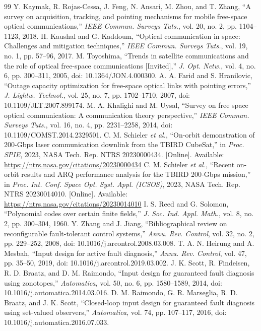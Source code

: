 \begin{thebibliography}{99}
 Y. Kaymak, R. Rojas-Cessa, J. Feng, N. Ansari, M. Zhou, and T. Zhang, ``A survey on acquisition, tracking, and pointing mechanisms for mobile free-space optical communications,'' \emph{IEEE Commun. Surveys Tuts.}, vol. 20, no. 2, pp. 1104--1123, 2018.
 H. Kaushal and G. Kaddoum, ``Optical communication in space: Challenges and mitigation techniques,'' \emph{IEEE Commun. Surveys Tuts.}, vol. 19, no. 1, pp. 57--96, 2017.
 M. Toyoshima, ``Trends in satellite communications and the role of optical free-space communications [Invited],'' \emph{J. Opt. Netw.}, vol. 4, no. 6, pp. 300--311, 2005, doi: 10.1364/JON.4.000300.
 A. A. Farid and S. Hranilovic, ``Outage capacity optimization for free-space optical links with pointing errors,'' \emph{J. Lightw. Technol.}, vol. 25, no. 7, pp. 1702--1710, 2007, doi: 10.1109/JLT.2007.899174.
 M. A. Khalighi and M. Uysal, ``Survey on free space optical communication: A communication theory perspective,'' \emph{IEEE Commun. Surveys Tuts.}, vol. 16, no. 4, pp. 2231--2258, 2014, doi: 10.1109/COMST.2014.2329501.
 C. M. Schieler \emph{et al.}, ``On-orbit demonstration of 200-Gbps laser communication downlink from the TBIRD CubeSat,'' in \emph{Proc. SPIE}, 2023, NASA Tech. Rep. NTRS 20230000434. [Online]. Available: \url{https://ntrs.nasa.gov/citations/20230000434}
 C. M. Schieler \emph{et al.}, ``Recent on-orbit results and ARQ performance analysis for the TBIRD 200-Gbps mission,'' in \emph{Proc. Int. Conf. Space Opt. Syst. Appl. (ICSOS)}, 2023, NASA Tech. Rep. NTRS 20230014010. [Online]. Available: \url{https://ntrs.nasa.gov/citations/20230014010}
 I. S. Reed and G. Solomon, ``Polynomial codes over certain finite fields,'' \emph{J. Soc. Ind. Appl. Math.}, vol. 8, no. 2, pp. 300--304, 1960.
 Y. Zhang and J. Jiang, ``Bibliographical review on reconfigurable fault-tolerant control systems,'' \emph{Annu. Rev. Control}, vol. 32, no. 2, pp. 229--252, 2008, doi: 10.1016/j.arcontrol.2008.03.008.
 T. A. N. Heirung and A. Mesbah, ``Input design for active fault diagnosis,'' \emph{Annu. Rev. Control}, vol. 47, pp. 35--50, 2019, doi: 10.1016/j.arcontrol.2019.03.002.
 J. K. Scott, R. Findeisen, R. D. Braatz, and D. M. Raimondo, ``Input design for guaranteed fault diagnosis using zonotopes,'' \emph{Automatica}, vol. 50, no. 6, pp. 1580--1589, 2014, doi: 10.1016/j.automatica.2014.03.016.
 D. M. Raimondo, G. R. Marseglia, R. D. Braatz, and J. K. Scott, ``Closed-loop input design for guaranteed fault diagnosis using set-valued observers,'' \emph{Automatica}, vol. 74, pp. 107--117, 2016, doi: 10.1016/j.automatica.2016.07.033.
\end{thebibliography}

